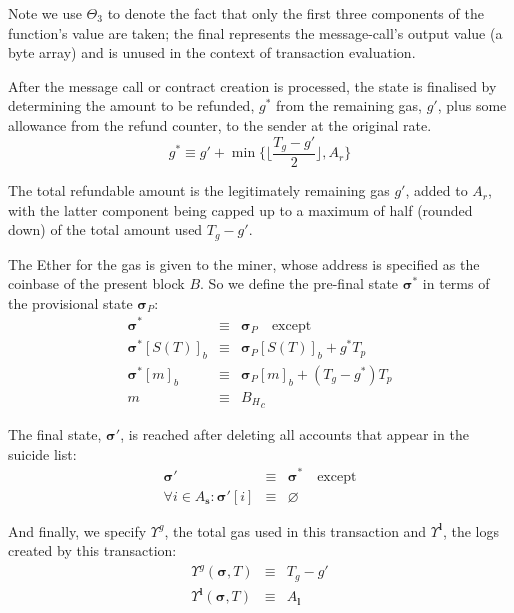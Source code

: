 \documentclass[9pt,oneside]{amsart}
\begin{document}
\begin{multicols}{2}
Note we use $\Theta_{3}$ to denote the fact that only the first three components of the function's value are taken; the final represents the message-call's output value (a byte array) and is unused in the context of transaction evaluation.

After the message call or contract creation is processed, the state is finalised by determining the amount to be refunded, $g^*$ from the remaining gas, $g'$, plus some allowance from the refund counter, to the sender at the original rate.
\begin{equation}
g^* \equiv g' + \min \{ \Big\lfloor \dfrac{T_g - g'}{2} \Big\rfloor, A_r \}
\end{equation}

The total refundable amount is the legitimately remaining gas $g'$, added to $A_r$, with the latter component being capped up to a maximum of half (rounded down) of the total amount used $T_g - g'$.

The Ether for the gas is given to the miner, whose address is specified as the coinbase of the present block $B$. So we define the pre-final state $\boldsymbol{\sigma}^*$ in terms of the provisional state $\boldsymbol{\sigma}_P$:
\begin{eqnarray}
\boldsymbol{\sigma}^* & \equiv & \boldsymbol{\sigma}_P \quad \text{except} \\
\boldsymbol{\sigma}^*[S(T)]_b & \equiv & \boldsymbol{\sigma}_P[S(T)]_b + g^* T_p \\
\boldsymbol{\sigma}^*[m]_b & \equiv & \boldsymbol{\sigma}_P[m]_b + (T_g - g^*) T_p \\
m & \equiv & {B_H}_c
\end{eqnarray}

The final state, $\boldsymbol{\sigma}'$, is reached after deleting all accounts that appear in the suicide list:
\begin{eqnarray}
\boldsymbol{\sigma}' & \equiv & \boldsymbol{\sigma}^* \quad \text{except} \\
\forall i \in A_\mathbf{s}: \boldsymbol{\sigma}'[i] & \equiv & \varnothing
\end{eqnarray}

And finally, we specify $\Upsilon^g$, the total gas used in this transaction and $\Upsilon^\mathbf{l}$, the logs created by this transaction:
\begin{eqnarray}
\Upsilon^g(\boldsymbol{\sigma}, T) & \equiv & T_g - g' \\
\Upsilon^\mathbf{l}(\boldsymbol{\sigma}, T) & \equiv & A_\mathbf{l}
\end{eqnarray}


\end{multicols}
\end{document}
